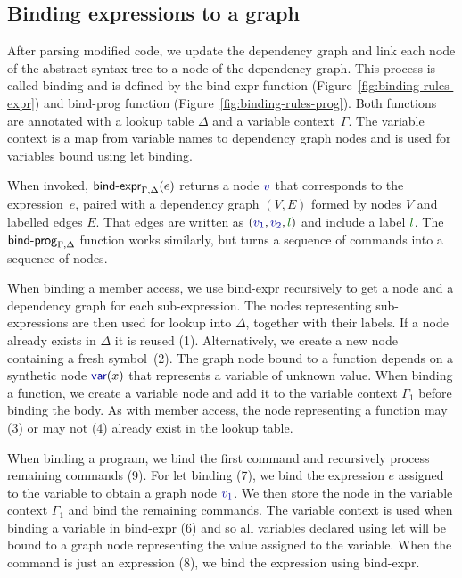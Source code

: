 \documentclass[english,crc]{programming}
\theoremstyle{plain}
\theoremstyle{definition}
\newcommand{\ident}[1]{\textnormal{\textcolor{idclr}{\sffamily #1}}}
\newcommand{\kvd}[1]{\textnormal{\textcolor{kvdclr}{\sffamily #1}}}
\newcommand{\bndclr}[1]{\textcolor{kvdclr}{#1}}
\newcommand{\blblclr}[1]{\textcolor{numclr}{#1}}
\newcommand{\bnd}[1]{\textnormal{\textcolor{kvdclr}{\sffamily #1}}}
\begin{document}

\subsection{Binding expressions to a graph}
\label{sec:formal-bind}

After parsing modified code, we update the dependency graph and link each node of the abstract
syntax tree to a node of the dependency graph. This process is called
binding and is defined by the \ident{bind-expr} function (Figure~\ref{fig:binding-rules-expr})
and \ident{bind-prog} function (Figure~\ref{fig:binding-rules-prog}). Both functions are
annotated with a lookup table $\Delta$ and a variable
context~$\Gamma$. The variable context is a map from variable names to dependency graph nodes and
is used for variables bound using \kvd{let} binding.

When invoked, $\ident{bind-expr}_{\Gamma,\Delta}(e)$ returns a node $\bndclr{v}$ that corresponds
to the expression~$e$, paired with a dependency graph $(V, E)$ formed by nodes $V$ and labelled
edges $E$. That edges are written as $(\bndclr{v_1}, \bndclr{v_2}, \blblclr{l})$ and include a
label $\blblclr{l}$. The $\ident{bind-prog}_{\Gamma,\Delta}$ function works similarly, but turns
a sequence of commands into a sequence of nodes.

When binding a member access, we use \ident{bind-expr} recursively
to get a node and a dependency graph for each sub-expression. The nodes representing sub-expressions are
then used for lookup into $\Delta$, together with their labels. If a node already
exists in $\Delta$ it is reused (1). Alternatively, we create a new node containing a fresh symbol~(2).
%
The graph node bound to a function depends on a synthetic node $\bnd{var}(x)$ that represents a
variable of unknown value. When binding a function, we create a variable node and add it
to the variable context $\Gamma_1$ before binding the body. As with member access, the node
representing a function may (3) or may not (4) already exist in the lookup table.

When binding a program, we bind the first command and
recursively process remaining commands (9). For \kvd{let} binding (7), we bind the expression $e$
assigned to the variable to obtain a graph node $\bndclr{v_1}$. We then store the node in the
variable context $\Gamma_1$ and bind the remaining commands. The variable context is used
when binding a variable in \ident{bind-expr} (6) and so all variables declared using \kvd{let}
will be bound to a graph node representing the value assigned to the variable. When the command
is just an expression (8), we bind the expression using \ident{bind-expr}.
\end{document}
